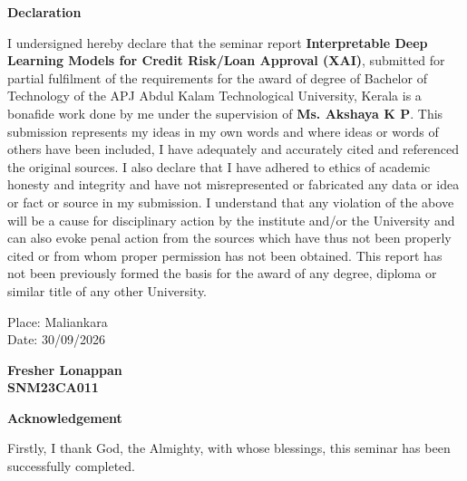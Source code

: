 \documentclass[12pt,a4paper,final]{extreport}
\begin{document}
\newpage

\thispagestyle{empty}
\begin{center}
\begin{huge}
\textbf{Declaration}
\end{huge}
\end{center}

\vskip0.5cm
I undersigned hereby declare that the seminar report \textbf{Interpretable Deep Learning Models for Credit Risk/Loan Approval (XAI)}, submitted for partial fulfilment of the requirements for the award of degree of Bachelor of Technology of the APJ Abdul Kalam Technological University, Kerala is a bonafide work done by me under the supervision of \textbf{Ms. Akshaya K P}. This submission represents my ideas in my own words and where ideas or words of others have been included, I have adequately and accurately cited and referenced the original sources. I also declare that I have adhered to ethics of academic honesty and integrity and have not misrepresented or fabricated any data or idea or fact or source in my submission. I understand that any violation of the above will be a cause for disciplinary action by the institute and/or the University and can also evoke penal action from the sources which have thus not been properly cited or from whom proper permission has not been obtained. This report has not been previously formed the basis for the award of any degree, diploma or similar title of any other University.

\vspace{2cm}
\noindent
\begin{minipage}[t]{0.5\textwidth}
Place: Maliankara\\
Date: 30/09/2026
\end{minipage}%
\hfill
\begin{minipage}[t]{0.4\textwidth}
\centering
\textbf{Fresher Lonappan}\\
\textbf{SNM23CA011}
\end{minipage}

\newpage
\thispagestyle{plain}
\setcounter{page}{1}
\begin{center}
\begin{huge}
\textbf{Acknowledgement}
\end{huge}
\end{center}
\vskip1cm
\hspace*{1 cm} Firstly, I thank God, the Almighty, with whose blessings, this seminar has been successfully completed.
\end{document}
